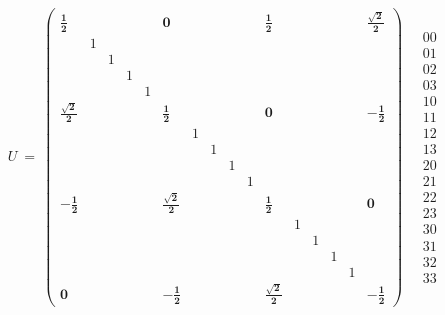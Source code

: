 \documentclass[12pt]{article}
\begin{document}
\begin{equation}
U\ =\ 
\begin{pmatrix}
\label{eq:U}
\pmb{\frac{1}{2}} &&&&& \pmb{0} &&&&& \pmb{\frac{1}{2}} &&&&& \pmb{\frac{\sqrt{2}}{2}} \\
  & 1 &   &   &   &   &   &   &   &   &   &   &   &   &   &   \\
  &   & 1 &   &   &   &   &   &   &   &   &   &   &   &   &   \\
  &   &   & 1 &   &   &   &   &   &   &   &   &   &   &   &   \\
  &   &   &   & 1 &   &   &   &   &   &   &   &   &   &   &   \\
\pmb{\frac{\sqrt{2}}{2}} &&&&& \pmb{\frac{1}{2}} &&&&& \pmb{0} &&&&& \pmb{-\frac{1}{2}} \\
  &   &   &   &   &   & 1 &   &   &   &   &   &   &   &   &   \\
  &   &   &   &   &   &   & 1 &   &   &   &   &   &   &   &   \\
  &   &   &   &   &   &   &   & 1 &   &   &   &   &   &   &   \\
  &   &   &   &   &   &   &   &   & 1 &   &   &   &   &   &   \\
\pmb{-\frac{1}{2}} &&&&& \pmb{\frac{\sqrt{2}}{2}} &&&&& \pmb{\frac{1}{2}} &&&&& \pmb{0} \\
  &   &   &   &   &   &   &   &   &   &   & 1 &   &   &   &   \\
  &   &   &   &   &   &   &   &   &   &   &   & 1 &   &   &   \\
  &   &   &   &   &   &   &   &   &   &   &   &   & 1 &   &   \\
  &   &   &   &   &   &   &   &   &   &   &   &   &   & 1 &   \\
\pmb{0} &&&&& \pmb{-\frac{1}{2}} &&&&& \pmb{\frac{\sqrt{2}}{2}} &&&&& \pmb{-\frac{1}{2}} 
\end{pmatrix}
\quad
\begin{matrix}
00 \\ 01 \\ 02 \\ 03 \\ 10 \\ 11 \\ 12 \\ 13 \\ 20 \\ 21 \\ 22 \\ 23 \\ 30 \\ 31 \\ 32 \\ 33 
\end{matrix}
\end{equation}
\end{document}
